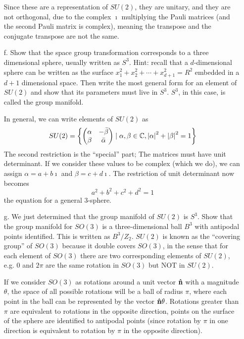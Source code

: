 \documentclass[a4paper,twoside]{article}
\begin{document}
\begin{itemize}
\begin{problem}
            Since these are a representation of $ SU(2) $, they are unitary, and they are not orthogonal, due to the complex $ \imath $ multiplying the Pauli matrices (and the second Pauli matrix is complex), meaning the transpose and the conjugate transpose are not the same.
        \end{problem}

    \item[f.] Show that the space group transformation corresponds to a three dimensional sphere, usually written as $ S^3 $. Hint: recall that a $ d $-dimensional sphere can be written as the surface $ x_1^2 + x_2^2 + \cdots + x_{d+1}^2 = R^2 $ embedded in a $ d + 1 $ dimensional space. Then write the most general form for an element of $ SU(2) $ and show that its parameters must live in $ S^3 $. $ S^3 $, in this case, is called the group manifold.
        \begin{problem}
            In general, we can write elements of $ SU(2) $ as
            \begin{equation}
                SU(2) =  \left\{ \mqty(\alpha & - \bar{\beta} \\ \beta & \bar{\alpha}) \mid \alpha, \beta \in \mathbb{C}, \abs{\alpha}^2 + \abs{\beta}^2 = 1\right\}
            \end{equation}
            The second restriction is the ``special'' part; The matrices must have unit determinant. If we consider these values to be complex (which we do), we can assign $ \alpha = a + b \imath $ and $ \beta = c + d \imath $. The restriction of unit determinant now becomes
            \begin{equation}
                a^2 + b^2 + c^2 + d^2 = 1
            \end{equation}
            the equation for a general $ 3 $-sphere.
        \end{problem}

    \item[g.] We just determined that the group manifold of $ SU(2) $ is $ S^3 $. Show that the group manifold for $ SO(3) $ is a three-dimensional ball $ B^3 $ with antipodal points identified. This is written as $ B^3 / Z_2 $. $ SU(2) $ is known as the ``covering group'' of $ SO(3) $ because it double covers $ SO(3) $, in the sense that for each element of $ SO(3) $ there are two corresponding elements of $ SU(2) $, e.g. $ 0 $ and $ 2 \pi $ are the same rotation in $ SO(3) $ but NOT in $ SU(2) $.
        \begin{problem}
            If we consider $ SO(3) $ as rotations around a unit vector $\vu{ n} $ with a magnitude $ \theta $, the space of all possible rotations will be a ball of radius $ \pi $, where each point in the ball can be represented by the vector $\vu{ n} \theta $. Rotations greater than $ \pi $ are equivalent to rotations in the opposite direction, points on the surface of the sphere are identified to antipodal points (since rotation by $ \pi $ in one direction is equivalent to rotation by $ \pi $ in the opposite direction).
        \end{problem}


\end{itemize}
\end{document}
